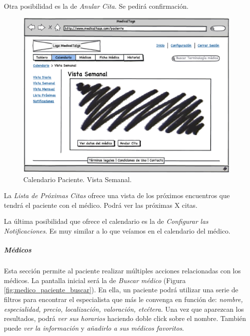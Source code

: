 		Otra posibilidad es la de \textit{Anular Cita}. Se pedirá confirmación.			
		
		
		\begin{figure}[H]
		  \centering
		    \includegraphics[width=12cm]{img/eps/27_Calendario_Paciente.eps}
		  \caption{Calendario Paciente. Vista Semanal.}
		  \label{fig:calendario_vista_semanal_paciente}
		\end{figure}
		
		La \textit{Lista de Próximas Citas} ofrece una vista de los próximos encuentros que tendrá el paciente con el médico. Podrá ver las próximas X citas.		
		
		La última posibilidad que ofrece el calendario es la de \textit{Configurar las Notificaciones}. Es muy similar a lo que veíamos en el calendario del médico. 	
		
		
		\subparagraph{Médicos} %
		\label{par:paciente_medicos}
		
			Esta sección permite al paciente realizar múltiples acciones relacionadas con los médicos. La pantalla inicial será la de \textit{Buscar médico} (Figura \ref{fig:medico_paciente_buscar}). En ella, un paciente podrá utilizar una serie de filtros para encontrar el especialista que más le convenga en función de: \textit{nombre, especialidad, precio, localización, valoración, etcétera.} Una vez que aparezcan los resultados, podrá \textit{ver sus horarios} haciendo doble click sobre el nombre. También puede \textit{ver la información} y \textit{añadirlo a sus médicos favoritos}. 
			

